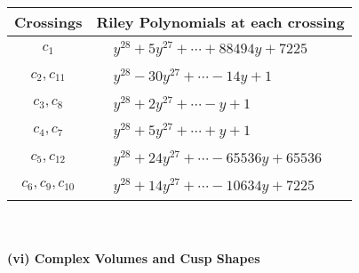 \documentclass[1p]{elsarticle_modified}
\theoremstyle{definition}
\begin{document}
\begin{tabular}{m{50pt}|m{274pt}}
Crossings & \hspace{64pt}Riley Polynomials at each crossing \\
\hline $$\begin{aligned}c_{1}\end{aligned}$$&$\begin{aligned}
&y^{28}+5 y^{27}+\cdots+88494 y+7225
\end{aligned}$\\
\hline $$\begin{aligned}c_{2},c_{11}\end{aligned}$$&$\begin{aligned}
&y^{28}-30 y^{27}+\cdots-14 y+1
\end{aligned}$\\
\hline $$\begin{aligned}c_{3},c_{8}\end{aligned}$$&$\begin{aligned}
&y^{28}+2 y^{27}+\cdots- y+1
\end{aligned}$\\
\hline $$\begin{aligned}c_{4},c_{7}\end{aligned}$$&$\begin{aligned}
&y^{28}+5 y^{27}+\cdots+y+1
\end{aligned}$\\
\hline $$\begin{aligned}c_{5},c_{12}\end{aligned}$$&$\begin{aligned}
&y^{28}+24 y^{27}+\cdots-65536 y+65536
\end{aligned}$\\
\hline $$\begin{aligned}c_{6},c_{9},c_{10}\end{aligned}$$&$\begin{aligned}
&y^{28}+14 y^{27}+\cdots-10634 y+7225
\end{aligned}$\\
\hline
\end{tabular}\\~\\
\newpage\flushleft \textbf{(vi) Complex Volumes and Cusp Shapes}
\end{document}
